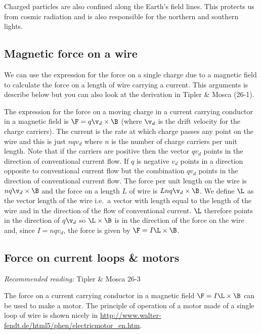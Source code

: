 \documentclass[
]{book}
\begin{document}
Charged particles are also confined along the Earth's field lines. This
protects us from cosmic radiation and is also responsible for the
northern and southern lights.

\hypertarget{magnetic-force-on-a-wire}{%
\subsection{Magnetic force on a wire}\label{magnetic-force-on-a-wire}}

We can use the expression for the force on a single charge due to a
magnetic field to calculate the force on a length of wire carrying a
current. This arguments is describe below but you can also look at the
derivation in Tipler \& Mosca (26-1).

The expression for the force on a moving charge in a current carrying
conductor in a magnetic field is \(\F = q\v_d \times \B\) (where \(\v_d\) is
the drift velocity for the charge carriers). The current is the rate at
which charge passes any point on the wire and this is just \(nqv_d\) where
\(n\) is the number of charge carriers per unit length. Note that if the
carriers are positive then the vector \(qv_d\) points in the direction of
conventional current flow. If \(q\) is negative \(v_d\) points in a
direction opposite to conventional current flow but the combination
\(qv_d\) points in the direction of conventional current flow. The force
per unit length on the wire is \(nq \v_d \times \B\) and the force on a
length \(L\) of wire is \(Lnq \v_d \times \B\). We define \(\L\) as the vector
length of the wire i.e.~a vector with length equal to the length of the
wire and in the direction of the flow of conventional current. \(\L\)
therefore points in the direction of \(q \v_d\) so \(\L \times \B\) is in
the direction of the force on the wire and, since \(I = nq v_d\), the
force is given by \(\F = I \L \times \B\).

\hypertarget{force-on-current-loops-motors}{%
\subsection{Force on current loops \& motors}\label{force-on-current-loops-motors}}

\emph{Recommended reading:} Tipler \& Mosca 26-3

The force on a current carrying conductor in a magnetic field
\(\F = I \L \times \B\) can be used to make a motor. The principle of
operation of a motor made of a single loop of wire is shown nicely in
\url{http://www.walter-fendt.de/html5/phen/electricmotor_en.htm}.
\end{document}
